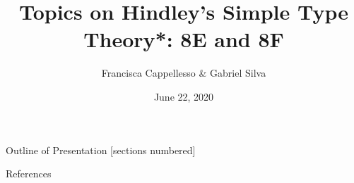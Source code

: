 \documentclass[10pt]{beamer}
\begin{document}
\newtheorem{mydef}{Definition}
\newtheorem{notation}{Notation}
\newtheorem{lem}{Lemma}
\newtheorem{theo}{Theorem}
\newtheorem{col}{Colollary}
\newtheorem{com}{Comment}
\newtheorem{exa}{Example}

\newtheorem{remark}{Remark}




\title {Topics on Hindley's Simple Type Theory*: 8E and 8F}

\author[Francisca Cappellesso and Gabriel Silva]{\small {Francisca Cappellesso \& Gabriel Silva}}

\date{\small June 22, 2020} 
\begin{frame}
\titlepage
\end{frame}
\begin{frame}{Outline of Presentation}
    [sections numbered]
    \tableofcontents
\end{frame}


% 





\nocite{*}
\begin{frame}[allowframebreaks]{References}


\end{frame}


\end{document}
